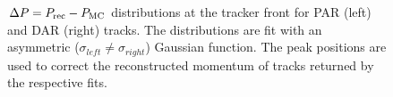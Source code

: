 \begin{figure}[h]
\hspace{-0.6in}

\caption{
  \label{fig:sindrum_ii_fig_08_fit} 
  $\Delta P = P_{\rm rec} - P_{\rm MC}$ distributions at the tracker front for PAR (left) and DAR (right) tracks.
  The distributions are fit with an asymmetric ($\sigma_{left} \ne \sigma_{right}$) Gaussian function. 
  The peak positions are used to correct the reconstructed momentum of tracks returned by the respective fits.
}
\end{figure}


